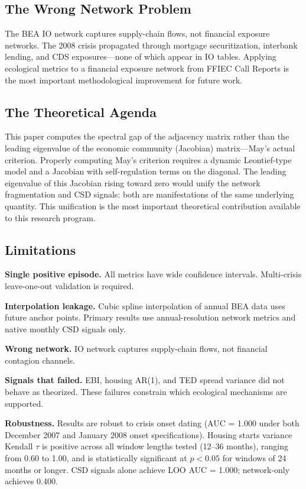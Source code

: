 \documentclass[12pt,a4paper]{article}
\begin{document}
\subsection{The Wrong Network Problem}

The BEA IO network captures supply-chain flows, not financial exposure networks. The
2008 crisis propagated through mortgage securitization, interbank lending, and CDS
exposures---none of which appear in IO tables. Applying ecological metrics to a
financial exposure network from FFIEC Call Reports is the most important methodological
improvement for future work.

\subsection{The Theoretical Agenda}

This paper computes the spectral gap of the adjacency matrix rather than the leading
eigenvalue of the economic community (Jacobian) matrix---May's actual criterion.
Properly computing May's criterion requires a dynamic Leontief-type model and a
Jacobian with self-regulation terms on the diagonal. The leading eigenvalue of this
Jacobian rising toward zero would unify the network fragmentation and CSD signals:
both are manifestations of the same underlying quantity. This unification is the most
important theoretical contribution available to this research program.

\subsection{Limitations}
\label{sec:limitations}

\textbf{Single positive episode.} All metrics have wide confidence intervals.
Multi-crisis leave-one-out validation is required.

\textbf{Interpolation leakage.} Cubic spline interpolation of annual BEA data uses
future anchor points. Primary results use annual-resolution network metrics and native
monthly CSD signals only.

\textbf{Wrong network.} IO network captures supply-chain flows, not financial
contagion channels.

\textbf{Signals that failed.} EBI, housing AR(1), and TED spread variance did not
behave as theorized. These failures constrain which ecological mechanisms are supported.

\textbf{Robustness.} Results are robust to crisis onset dating (AUC = 1.000 under
both December 2007 and January 2008 onset specifications). Housing starts variance
Kendall $\tau$ is positive across all window lengths tested (12--36 months), ranging
from 0.60 to 1.00, and is statistically significant at $p < 0.05$ for windows of
24 months or longer. CSD signals alone achieve LOO AUC = 1.000; network-only
achieves 0.400.
\end{document}
